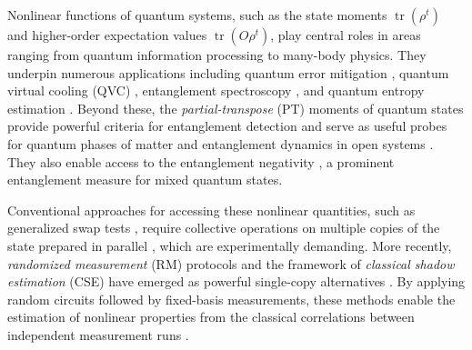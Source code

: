 \documentclass[aps,prl,twocolumn,nofootinbib,superscriptaddress,10pt]{revtex4-2}
\DeclareMathOperator{\Tr}{tr}
\newcommand{\zy}[1]{\textcolor{red}{(ZY: #1)}}
\theoremstyle{plain}
\theoremstyle{definition}
\begin{document}
\maketitle  

\def \loopwidth {1em}
\def \colspacing {2em}
\def \rowspacing {1.5em}
\setlength\tabcolsep{20pt}
\newsavebox{\composition}
\newsavebox{\tensorproduct}
\newsavebox{\traceytrace}

\let\oldaddcontentsline\addcontentsline
\renewcommand{\addcontentsline}[3]{}




Nonlinear functions of quantum systems, such as the state moments $\Tr(\rho^t)$ and higher-order expectation values $\Tr(O\rho^t)$, play central roles in areas ranging from quantum information processing to many-body physics. 
They underpin numerous applications including quantum error mitigation 
\cite{PhysRevX.11.041036,PhysRevX.11.031057,RevModPhys.95.045005,PRXQuantum.4.010303,zhou2024hybrid,PhysRevLett.133.080601,o2023purification}, quantum virtual cooling (QVC) 
\cite{PhysRevX.9.031013,PhysRevLett.133.080601}, entanglement spectroscopy 
\cite{PhysRevB.96.195136,Yirka2021qubitefficient}, and quantum entropy estimation \cite{islam2015measuring,brydges2019probing,PhysRevLett.120.050406,PhysRevA.97.023604}. 
Beyond these, the \emph{partial-transpose} (PT) moments of quantum states 
provide powerful criteria for entanglement detection \cite{PhysRevLett.121.150503,elben2020mixedstate,singlezhou,Neven2021Entanglement,Yu2021Entanglement} and serve as useful probes for quantum phases of matter and entanglement dynamics in open systems \cite{PhysRevLett.109.130502,PhysRevB.94.035152,PhysRevLett.125.140603}. 
They also enable access to the entanglement negativity \cite{PhysRevLett.95.090503,PhysRevA.65.032314,PhysRevA.109.012422,carteret2016estimating}, a prominent entanglement measure for mixed quantum states.


Conventional approaches for accessing these nonlinear quantities, such as generalized swap tests \cite{PhysRevLett.88.217901,bruni2004measurimg,Quek2024multivariatetrace}, require collective operations on multiple copies of the state prepared in parallel \cite{liu2025estimating,liu2024auxiliary,Shin2025resourceefficient,PhysRevLett.94.040502,PhysRevLett.129.260501,zhang2025measuring,chen2025simultaneous,shi2025near,ye2025exponential}, which are experimentally demanding. %
More recently, \emph{randomized measurement} (RM) protocols and the framework of \emph{classical shadow estimation} (CSE) have emerged as powerful single-copy alternatives \cite{PhysRevLett.108.110503,HKPshadow20,PhysRevX.14.031035,PhysRevLett.124.010504,elben2023randomized,PhysRevA.99.052323,PhysRevLett.108.110503,PhysRevResearch.5.023027,PRXQuantum.5.010352,arienzo2023closed,PhysRevLett.130.230403}.
By applying random circuits followed by fixed-basis measurements, these methods enable the estimation of nonlinear properties from the classical correlations between independent measurement runs \cite{elben2023randomized}.
\end{document}
